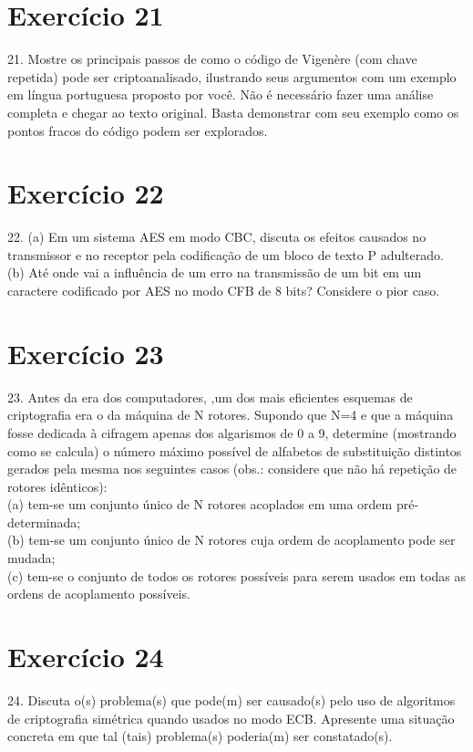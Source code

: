\documentclass[10pt,a4paper]{article}
\begin{document}
\section*{Exercício 21}
21. Mostre os principais passos de como o código de Vigenère (com chave repetida) pode ser criptoanalisado, ilustrando seus argumentos com um exemplo em língua portuguesa proposto por você. Não é necessário fazer uma análise completa e chegar ao texto original. Basta demonstrar com seu exemplo como os pontos fracos do código podem ser explorados.\\
\section*{Exercício 22}
22. (a) Em um sistema AES em modo CBC, discuta os efeitos causados no transmissor e no receptor pela codificação de um bloco de texto P adulterado.\\
(b) Até onde vai a influência de um erro na transmissão de um bit em um caractere codificado por AES no modo CFB de 8 bits? Considere o pior caso.\\
\section*{Exercício 23}
23. Antes da era dos computadores, ,um dos mais eficientes esquemas de criptografia era o da máquina de N rotores. Supondo que N=4 e que a máquina fosse dedicada à cifragem apenas dos algarismos de 0 a 9, determine (mostrando como se calcula) o número máximo possível de alfabetos de substituição distintos gerados pela mesma nos seguintes casos (obs.: considere que não há repetição de rotores idênticos):\\
(a) tem-se um conjunto único de N rotores acoplados em uma ordem pré-determinada;\\
(b) tem-se um conjunto único de N rotores cuja ordem de acoplamento pode ser mudada;\\
(c) tem-se o conjunto de todos os rotores possíveis para serem usados em todas as ordens de acoplamento possíveis.\\
\section*{Exercício 24}
24. Discuta o(s) problema(s) que pode(m) ser causado(s) pelo uso de algoritmos de criptografia simétrica quando usados no modo ECB. Apresente uma situação concreta em que tal (tais) problema(s) poderia(m) ser constatado(s).\\
\end{document}
